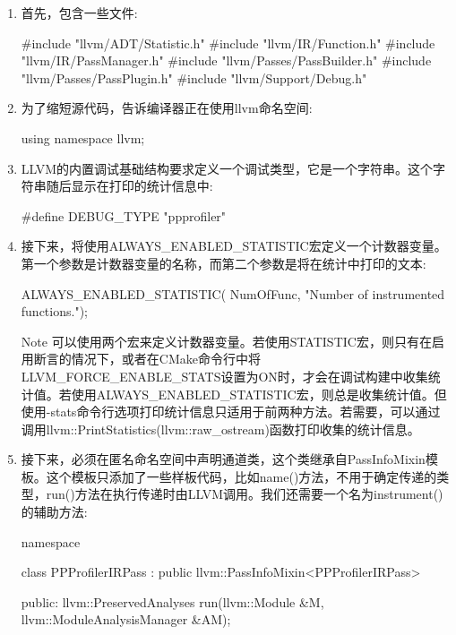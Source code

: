 \begin{enumerate}
\item
首先，包含一些文件:

\begin{cpp}
#include "llvm/ADT/Statistic.h"
#include "llvm/IR/Function.h"
#include "llvm/IR/PassManager.h"
#include "llvm/Passes/PassBuilder.h"
#include "llvm/Passes/PassPlugin.h"
#include "llvm/Support/Debug.h"
\end{cpp}

\item
为了缩短源代码，告诉编译器正在使用llvm命名空间:

\begin{cpp}
using namespace llvm;
\end{cpp}

\item
LLVM的内置调试基础结构要求定义一个调试类型，它是一个字符串。这个字符串随后显示在打印的统计信息中:

\begin{cpp}
#define DEBUG_TYPE "ppprofiler"
\end{cpp}

\item
接下来，将使用ALWAYS\_ENABLED\_STATISTIC宏定义一个计数器变量。第一个参数是计数器变量的名称，而第二个参数是将在统计中打印的文本:

\begin{cpp}
ALWAYS_ENABLED_STATISTIC(
    NumOfFunc, "Number of instrumented functions.");
\end{cpp}

\begin{myNotic}{Note}
可以使用两个宏来定义计数器变量。若使用STATISTIC宏，则只有在启用断言的情况下，或者在CMake命令行中将LLVM\_FORCE\_ENABLE\_STATS设置为ON时，才会在调试构建中收集统计值。若使用ALWAYS\_ENABLED\_STATISTIC宏，则总是收集统计值。但使用-stats命令行选项打印统计信息只适用于前两种方法。若需要，可以通过调用llvm::PrintStatistics(llvm::raw\_ostream)函数打印收集的统计信息。
\end{myNotic}

\item
接下来，必须在匿名命名空间中声明通道类，这个类继承自PassInfoMixin模板。这个模板只添加了一些样板代码，比如name()方法，不用于确定传递的类型，run()方法在执行传递时由LLVM调用。我们还需要一个名为instrument()的辅助方法:

\begin{cpp}
namespace {
class PPProfilerIRPass
: public llvm::PassInfoMixin<PPProfilerIRPass> {
public:
    llvm::PreservedAnalyses
    run(llvm::Module &M, llvm::ModuleAnalysisManager &AM);

}}
\end{cpp}
\end{enumerate}
